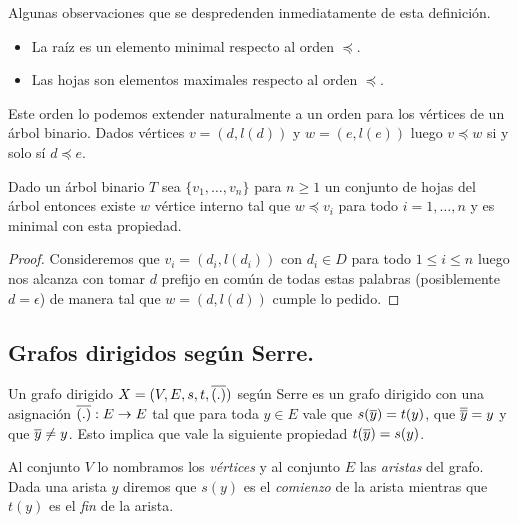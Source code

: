 \documentclass[tesis.tex]{subfiles}
\begin{document}
\begin{leoenv}
Algunas observaciones que se despredenden inmediatamente de esta definición.
\begin{itemize}
	\item La raíz es un elemento minimal respecto al orden $\preceq$.
	\item Las hojas son elementos maximales respecto al orden $\preceq$.
\end{itemize}

Este orden lo podemos extender naturalmente a un orden para los vértices de un árbol binario. 
Dados vértices $v =(d,l(d))$ y $w = (e,l(e))$ luego $v \preceq w$ si y solo sí $d \preceq e$.

\begin{lema}
	Dado un árbol binario $T$ sea $\{ v_{1}, \dots, v_{n} \}$ para $n \ge 1$ un conjunto de hojas del árbol entonces existe $w$ vértice interno tal que $w \preceq v_{i}$ para todo $i=1, \dots, n$ y es minimal con esta propiedad.
\end{lema}
\begin{proof}
	Consideremos que $v_{i} = (d_{i}, l(d_{i}))$ con $d_{i} \in D$ para todo $1 \le i \le n$ luego nos alcanza con tomar $d$ prefijo en común de todas estas palabras (posiblemente $d = \epsilon$) de manera tal que $w = (d,l(d))$ cumple lo pedido.

\end{proof}



\subsection{Grafos dirigidos según Serre.}
\begin{deff}
	Un grafo dirigido $X = (V,E,s,t,\overline{(.)})$ según Serre es un grafo dirigido con una asignación $\overline{(.)}:E \to E$ tal que para toda $y \in E$ vale que $s(\overline{y}) = t(y)$, que $\overline{\overline y} = y$ y que $\overline{y} \neq y$.
	Esto implica que vale la siguiente propiedad $t(\overline y) = s(y)$.

	
	
	Al conjunto $V$ lo nombramos los \emph{vértices} y al conjunto $E$ las \emph{aristas} del grafo.
	Dada una arista $y$ diremos que $s(y)$ es el \emph{comienzo} de la arista mientras que $t(y)$ es el \emph{fin} de la arista.
	

\end{deff}
\end{leoenv}
\end{document}
